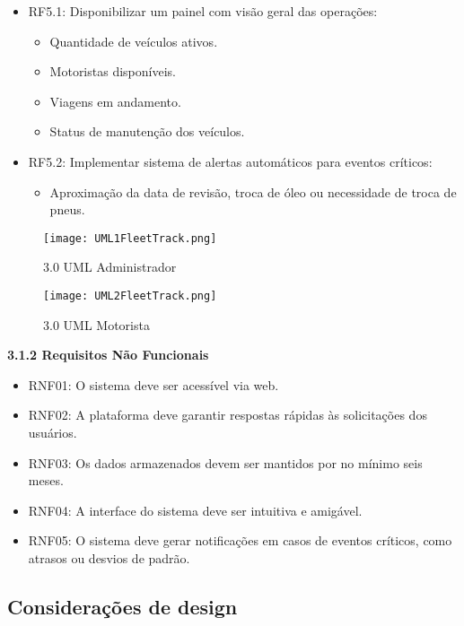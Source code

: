 \documentclass[12pt]{article}
\begin{document}
\begin{itemize}
    \begin{itemize}
        \item RF5.1: Disponibilizar um painel com visão geral das operações:
        \begin{itemize}
            \item Quantidade de veículos ativos.
            \item Motoristas disponíveis.
            \item Viagens em andamento.
            \item Status de manutenção dos veículos.
        \end{itemize}
        \item RF5.2: Implementar sistema de alertas automáticos para eventos críticos:
        \begin{itemize}
            \item Aproximação da data de revisão, troca de óleo ou necessidade de troca de pneus.
        \end{itemize}
    \end{itemize}
\end{itemize}
\begin{figure}[!hbtp]
    \centering
    \texttt{[image: UML1FleetTrack.png]}
    \caption{3.0 UML Administrador}
    \label{fig:uml-admin}
\end{figure}
\begin{figure}[!htp]
    \centering
    \texttt{[image: UML2FleetTrack.png]}
    \caption{3.0 UML Motorista}
    \label{fig:uml-motorista}
\end{figure}

\newpage
\textbf{3.1.2 Requisitos Não Funcionais}
\begin{itemize}
\item RNF01: O sistema deve ser acessível via web.
\item RNF02: A plataforma deve garantir respostas rápidas às solicitações dos usuários.
\item RNF03: Os dados armazenados devem ser mantidos por no mínimo seis meses.
\item RNF04: A interface do sistema deve ser intuitiva e amigável.
\item RNF05: O sistema deve gerar notificações em casos de eventos críticos, como atrasos ou desvios de padrão.
\end{itemize}

\subsection{Considerações de design}
\end{document}
